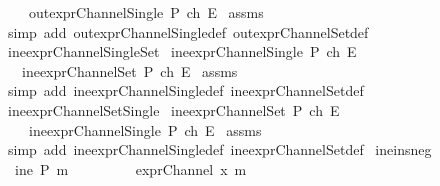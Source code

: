 \begin{isabellebody}
\ \ \ \ {\isachardoublequoteopen}out{\isacharunderscore}exprChannelSingle\ P\ ch\ E{\isachardoublequoteclose}\isanewline
%
\isadelimproof
%
\endisadelimproof
%
\isatagproof
{}\isamarkupfalse%
\ assms\isanewline
{}\isamarkupfalse%
\ {\isacharparenleft}simp\ add{\isacharcolon}\ out{\isacharunderscore}exprChannelSingle{\isacharunderscore}def\ out{\isacharunderscore}exprChannelSet{\isacharunderscore}def{\isacharparenright}%
\endisatagproof
{\isafoldproof}%
%
\isadelimproof
\isanewline
%
\endisadelimproof
\isanewline
{}\isamarkupfalse%
\ ine{\isacharunderscore}exprChannelSingle{\isacharunderscore}Set{\isacharcolon}\isanewline
{}\ {\isachardoublequoteopen}ine{\isacharunderscore}exprChannelSingle\ P\ ch\ E{\isachardoublequoteclose}\isanewline
\ \ \ {\isachardoublequoteopen}ine{\isacharunderscore}exprChannelSet\ P\ {\isacharbraceleft}ch{\isacharbraceright}\ E{\isachardoublequoteclose}\isanewline
%
\isadelimproof
%
\endisadelimproof
%
\isatagproof
{}\isamarkupfalse%
\ assms\ \isanewline
{}\isamarkupfalse%
\ {\isacharparenleft}simp\ add{\isacharcolon}\ ine{\isacharunderscore}exprChannelSingle{\isacharunderscore}def\ ine{\isacharunderscore}exprChannelSet{\isacharunderscore}def{\isacharparenright}%
\endisatagproof
{\isafoldproof}%
%
\isadelimproof
\isanewline
%
\endisadelimproof
\isanewline
{}\isamarkupfalse%
\ ine{\isacharunderscore}exprChannelSet{\isacharunderscore}Single{\isacharcolon}\isanewline
{}\ {\isachardoublequoteopen}ine{\isacharunderscore}exprChannelSet\ P\ {\isacharbraceleft}ch{\isacharbraceright}\ E{\isachardoublequoteclose}\isanewline
{}\ \ \ \ {\isachardoublequoteopen}ine{\isacharunderscore}exprChannelSingle\ P\ ch\ E{\isachardoublequoteclose}\isanewline
%
\isadelimproof
%
\endisadelimproof
%
\isatagproof
{}\isamarkupfalse%
\ assms\ \isanewline
{}\isamarkupfalse%
\ {\isacharparenleft}simp\ add{\isacharcolon}\ ine{\isacharunderscore}exprChannelSingle{\isacharunderscore}def\ ine{\isacharunderscore}exprChannelSet{\isacharunderscore}def{\isacharparenright}%
\endisatagproof
{\isafoldproof}%
%
\isadelimproof
\isanewline
%
\endisadelimproof
\isanewline
{}\isamarkupfalse%
\ ine{\isacharunderscore}ins{\isacharunderscore}neg{}{\isacharcolon}\isanewline
{}\ {\isachardoublequoteopen}{\isasymnot}\ ine\ P\ m{\isachardoublequoteclose}\ \isanewline
\ \ \ \ \ \ \ \ {\isachardoublequoteopen}exprChannel\ x\ m{\isachardoublequoteclose}\isanewline

\end{isabellebody}
